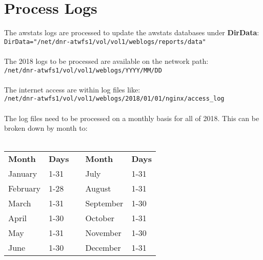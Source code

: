 
\newpage
\section{Process Logs}
The awstats logs are processed to update the awstats databases
under \textbf{DirData}:\\
\indent\texttt{DirData="/net/dnr-atwfs1/vol/vol1/weblogs/reports/data"}\\
\\
The 2018 logs to be processed are available on the network path:\\
\indent\texttt{/net/dnr-atwfs1/vol/vol1/weblogs/YYYY/MM/DD}\\
\\
The internet access are within log files like:\\
\indent\texttt{/net/dnr-atwfs1/vol/vol1/weblogs/2018/01/01/nginx/access\_log}\\
\\
The log files need to be processed on a monthly basis for all of
2018. This can be broken down by month to:\\
\\
\noindent\begin{tabular}{ l l l l l}
\bf{Month} & \bf{Days} & \hspace{.75cm} & \bf{Month} & \bf{Days} \\
January    & 1-31      & \hspace{.75cm} & July       & 1-31 \\
February   & 1-28      & \hspace{.75cm} & August     & 1-31 \\
March      & 1-31      & \hspace{.75cm} & September  & 1-30 \\
April      & 1-30      & \hspace{.75cm} & October    & 1-31 \\
May        & 1-31      & \hspace{.75cm} & November   & 1-30 \\
June       & 1-30      & \hspace{.75cm} & December   & 1-31 \\
\end{tabular}



